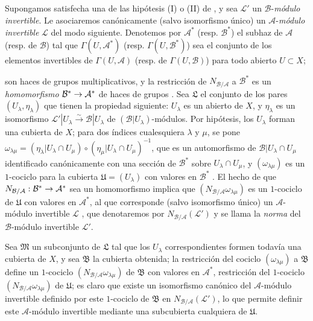\documentclass[oneside,10pt]{amsart}
\makeatletter
\newcommand{\ega@arrow}[2]{\mathchoice{#1}{#2}{#2}{#2}}
\renewcommand{\to}{\ega@arrow{\longrightarrow}{\rightarrow}}
\newcommand{\oldpage}[2][]{\marginnote{\normalfont\footnotesize\textbf{#1}~|~#2}\ignorespaces}
\let\EGAOriginalLabel\label
\renewcommand{\label}[1]{\phantomsection\EGAOriginalLabel{#1}}
\makeatother
\begin{document}
\begin{env}[6.5.2]
\label{II.6.5.2-fr}
Supongamos satisfecha una de las hipótesis (I) o (II) de , y sea $\mathcal{L}'$ un $\mathcal{B}$-\emph{módulo invertible}.
Le asociaremos canónicamente (salvo isomorfismo único) un $\mathcal{A}$-\emph{módulo invertible} $\mathcal{L}$ del modo siguiente.
Denotemos por $\mathcal{A}^*$ (resp. $\mathcal{B}^*$) el subhaz de $\mathcal{A}$ (resp. de $\mathcal{B}$) tal que $\Gamma(U,\mathcal{A}^*)$ (resp. $\Gamma(U,\mathcal{B}^*)$) sea el conjunto de los 
\oldpage[II]{127}
elementos invertibles de $\Gamma(U,\mathcal{A})$ (resp. de $\Gamma(U,\mathcal{B})$) para todo abierto $U\subset X$;

son haces de grupos multiplicativos, y la restricción de $N_{\mathcal{B}/\mathcal{A}}$ a $\mathcal{B}^*$ es un \emph{homomorfismo} $\mathcal{B}^*\to\mathcal{A}^*$ de haces de grupos .
Sea $\mathfrak{L}$ el conjunto de los pares $(U_\lambda,\eta_\lambda)$ que tienen la propiedad siguiente: $U_\lambda$ es un abierto de $X$, y $\eta_\lambda$ es un isomorfismo $\mathcal{L}'|U_\lambda\xrightarrow{\sim}\mathcal{B}|U_\lambda$ de $(\mathcal{B}|U_\lambda)$-módulos.
Por hipótesis, los $U_\lambda$ forman una cubierta de $X$;
para dos índices cualesquiera $\lambda$ y $\mu$, se pone $\omega_{\lambda\mu}=(\eta_\lambda|U_\lambda\cap U_\mu)
\circ(\eta_\mu|U_\lambda\cap U_\mu)^{-1}$, que es un automorfismo de $\mathcal{B}|U_\lambda\cap U_\mu$ identificado canónicamente con una sección de $\mathcal{B}^*$ sobre $U_\lambda\cap U_\mu$, y $(\omega_{\lambda\mu})$ es un $1$-cociclo para la cubierta $\mathfrak{U}=(U_\lambda)$ con valores en $\mathcal{B}^*$ .
El hecho de que $N_{\mathcal{B}/\mathcal{A}}:\mathcal{B}^*\to\mathcal{A}^*$ sea un homomorfismo implica que $(N_{\mathcal{B}/\mathcal{A}}\omega_{\lambda\mu})$ es un $1$-cociclo de $\mathfrak{U}$ con valores en $\mathcal{A}^*$, al que corresponde (salvo isomorfismo único) un $\mathcal{A}$-módulo invertible $\mathcal{L}$ , que denotaremos por $N_{\mathcal{B}/\mathcal{A}}(\mathcal{L}')$ y se llama la \emph{norma} del $\mathcal{B}$-módulo invertible $\mathcal{L}'$.

Sea $\mathfrak{M}$ un subconjunto de $\mathfrak{L}$ tal que los $U_\lambda$ correspondientes formen todavía una cubierta de $X$, y sea $\mathfrak{B}$ la cubierta obtenida;
la restricción del cociclo $(\omega_{\lambda\mu})$ a $\mathfrak{B}$ define un $1$-cociclo $(N_{\mathcal{B}/\mathcal{A}}\omega_{\lambda\mu})$ de $\mathfrak{B}$ con valores en $\mathcal{A}^*$, restricción del $1$-cociclo $(N_{\mathcal{B}/\mathcal{A}}\omega_{\lambda\mu})$ de $\mathfrak{U}$;
es claro que existe un isomorfismo canónico del $\mathcal{A}$-módulo invertible definido por este $1$-cociclo de $\mathfrak{B}$ en $N_{\mathcal{B}/\mathcal{A}}(\mathcal{L}')$, lo que permite definir este $\mathcal{A}$-módulo invertible mediante una subcubierta cualquiera de $\mathfrak{U}$.


\end{env}
\end{document}
